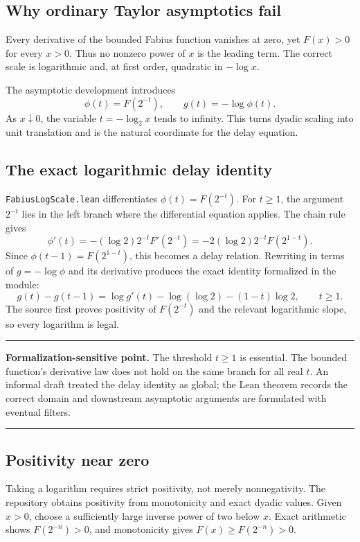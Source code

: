 \documentclass[11pt,oneside]{article}
\theoremstyle{definition}
\theoremstyle{remark}
\newenvironment{boxedremark}{%
  \par\smallskip\noindent\begin{center}\begin{minipage}{0.94\textwidth}%
  \color{black}\hrule\vspace{0.6em}\small
}{%
  \vspace{0.6em}\hrule\end{minipage}\end{center}\smallskip
}
\begin{document}
\subsection{Why ordinary Taylor asymptotics fail}
Every derivative of the bounded Fabius function vanishes at zero, yet \(F(x)>0\) for every \(x>0\).  Thus no nonzero power of \(x\) is the leading term.  The correct scale is logarithmic and, at first order, quadratic in \(-\log x\).

The asymptotic development introduces
\[
  \phi(t)=F(2^{-t}),
  \qquad
  g(t)=-\log \phi(t).
\]
As \(x\downarrow0\), the variable \(t=-\log_2x\) tends to infinity.  This turns dyadic scaling into unit translation and is the natural coordinate for the delay equation.

\subsection{The exact logarithmic delay identity}
\nolinkurl{FabiusLogScale.lean} differentiates \(\phi(t)=F(2^{-t})\).  For \(t\geq1\), the argument \(2^{-t}\) lies in the left branch where the differential equation applies.  The chain rule gives
\[
  \phi'(t)
  =-(\log2)2^{-t}F'(2^{-t})
  =-2(\log2)2^{-t}F(2^{1-t}).
\]
Since \(\phi(t-1)=F(2^{1-t})\), this becomes a delay relation.  Rewriting in terms of \(g=-\log\phi\) and its derivative produces the exact identity formalized in the module:
\[
  g(t)-g(t-1)
  =\log g'(t)-\log(\log2)-(1-t)\log2,
  \qquad t\geq1.
\]
The source first proves positivity of \(F(2^{-t})\) and the relevant logarithmic slope, so every logarithm is legal.

\begin{boxedremark}\textbf{Formalization-sensitive point.}\space
The threshold \(t\geq1\) is essential.  The bounded function's derivative law does not hold on the same branch for all real \(t\).  An informal draft treated the delay identity as global; the Lean theorem records the correct domain and downstream asymptotic arguments are formulated with eventual filters.
\end{boxedremark}

\subsection{Positivity near zero}
Taking a logarithm requires strict positivity, not merely nonnegativity.  The repository obtains positivity from monotonicity and exact dyadic values.  Given \(x>0\), choose a sufficiently large inverse power of two below \(x\).  Exact arithmetic shows \(F(2^{-n})>0\), and monotonicity gives \(F(x)\geq F(2^{-n})>0\).
\end{document}
